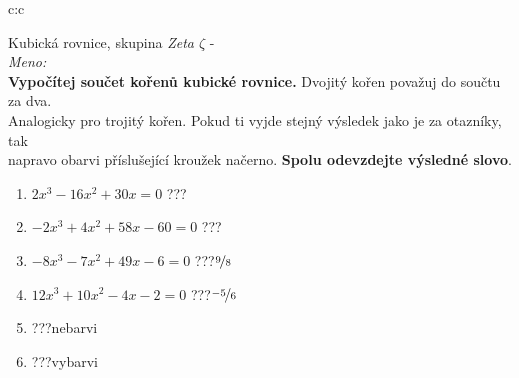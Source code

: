 \documentclass[10pt]{report}
\begin{document}
\clearpage
\thispagestyle{empty}
\begin{tabular}{c:c}
\begin{minipage}[c][99mm][t]{0.49\linewidth}
\begin{center}
\vspace{7mm}
{\huge Kubická rovnice, skupina \textit{Zeta $\zeta$} -}\\[4.5mm]
\textit{Meno:}\phantom{xxxxxxxxxxxxxxxxxxxxxxxxxxxxxxxxxxxxxxxxxxxxxxxxxxxxxxxxxxxxxxxxx}\\[3.5mm]
\textbf{Vypočítej součet kořenů kubické rovnice.} Dvojitý kořen považuj do součtu za dva.\\Analogicky pro trojitý kořen. Pokud ti vyjde stejný výsledek jako je za otazníky, tak\\napravo obarvi příslušející kroužek načerno. \textbf{Spolu odevzdejte výsledné slovo}.\\[3mm]
\begin{minipage}{0.77\linewidth}
\begin{center}
\begin{varwidth}{\textwidth}
\begin{enumerate}
\large
\item $2x^3-16x^2+30x=0$\quad \dotfill\; ???\;\dotfill {}
\item $-2x^3+4x^2+58x-60=0$\quad \dotfill\; ???\;\dotfill {}
\item $-8x^3-7x^2+49x-6=0$\quad \dotfill\; ???\;\dotfill \quad $\nicefrac{9}{8}$
\item $12x^3+10x^2-4x-2=0$\quad \dotfill\; ???\;\dotfill \quad $\nicefrac{-5}{6}$
\item \quad \dotfill\; ???\;\dotfill \quad nebarvi
\item \quad \dotfill\; ???\;\dotfill \quad vybarvi
\end{enumerate}
\end{varwidth}
\end{center}
\end{minipage}
\begin{minipage}{0.20\linewidth}

\end{minipage}
\end{center}
\end{minipage}
\end{tabular}
\end{document}

